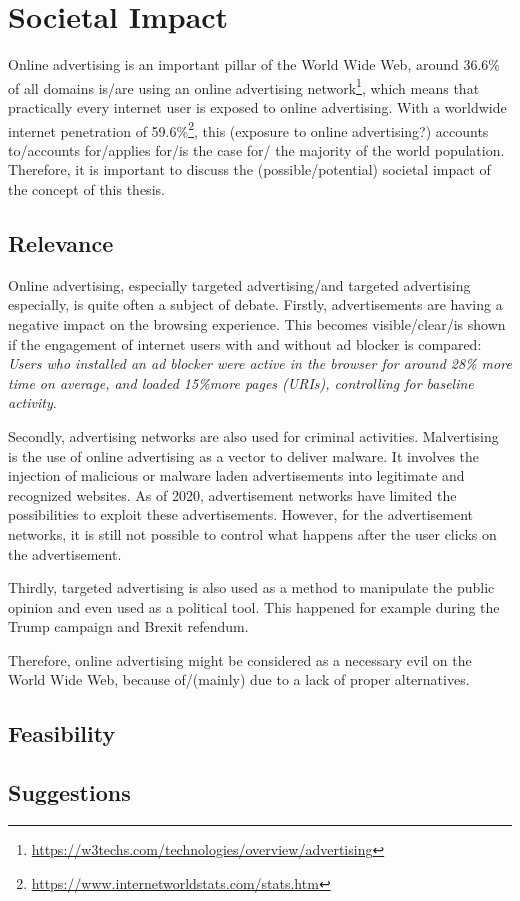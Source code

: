 \chapter{Societal Impact}
\label{cha:societalimpact}

Online advertising is an important pillar of the World Wide Web, around 36.6\% of all domains is/are using an online advertising network\footnote{\url{https://w3techs.com/technologies/overview/advertising}}, which means that practically every internet user is exposed to online advertising. With a worldwide internet penetration of 59.6\%\footnote{\url{https://www.internetworldstats.com/stats.htm}}, this (exposure to online advertising?) accounts to/accounts for/applies for/is the case for/ the majority of the world population. Therefore, it is important to discuss the (possible/potential) societal impact of the concept of this thesis.

\section{Relevance}
Online advertising, especially targeted advertising/and targeted advertising especially, is quite often a subject of debate. Firstly, advertisements are having a negative impact on the browsing experience. This becomes visible/clear/is shown if the engagement of internet users with and without ad blocker is compared: \textit{Users who installed an ad blocker were active in the browser for around 28\% more time on average, and loaded 15\%more pages (URIs), controlling for baseline activity}\cite{googlefee}.

Secondly, advertising networks are also used for criminal activities. Malvertising is the use of online advertising as a vector to deliver malware. It involves the injection of malicious or malware laden advertisements into legitimate and recognized websites\cite{dwyer2016gone}. As of 2020, advertisement networks have limited the possibilities to exploit these advertisements. However, for the advertisement networks, it is still not possible to control what happens after the user clicks on the advertisement.

Thirdly, targeted advertising is also used as a method to manipulate the public opinion and even used as a political tool. This happened for example during the Trump campaign and Brexit refendum\cite{cadwalladr2018cambridge}.

Therefore, online advertising might be considered as a necessary evil on the World Wide Web, because of/(mainly) due to a lack of proper alternatives.

\section{Feasibility}

\section{Suggestions}
